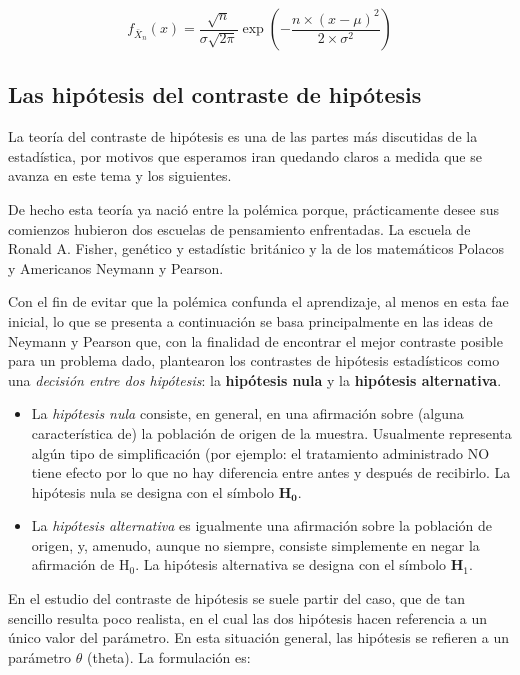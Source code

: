 \documentclass[
]{article}
\begin{document}
\[
f_{\bar{X}_{n}}(x)=\frac{\sqrt{n}}{\sigma \sqrt{2 \pi}} \exp \left(-\frac{n \times(x-\mu)^{2}}{2 \times \sigma^{2}}\right)
\]

\subsection{Las hipótesis del contraste de hipótesis}\label{las-hipuxf3tesis-del-contraste-de-hipuxf3tesis}

La teoría del contraste de hipótesis es una de las partes más discutidas de la estadística, por motivos que esperamos iran quedando claros a medida que se avanza en este tema y los siguientes.

De hecho esta teoría ya nació entre la polémica porque, prácticamente desee sus comienzos hubieron dos escuelas de pensamiento enfrentadas. La escuela de Ronald A. Fisher, genético y estadístic británico y la de los matemáticos Polacos y Americanos Neymann y Pearson.

Con el fin de evitar que la polémica confunda el aprendizaje, al menos en esta fae inicial, lo que se presenta a continuación se basa principalmente en las ideas de Neymann y Pearson que, con la finalidad de encontrar el mejor contraste posible para un problema dado, plantearon los contrastes de hipótesis estadísticos como una \emph{decisión entre dos hipótesis}: la \textbf{hipótesis nula} y la \textbf{hipótesis alternativa}.

\begin{itemize}
\item
  La \emph{hipótesis nula} consiste, en general, en una afirmación sobre (alguna característica de) la población de origen de la muestra. Usualmente representa algún tipo de simplificación (por ejemplo: el tratamiento administrado NO tiene efecto por lo que no hay diferencia entre antes y después de recibirlo. La hipótesis nula se designa con el símbolo \(\mathbf{H}_{\mathbf{0}}\).
\item
  La \emph{hipótesis alternativa} es igualmente una afirmación sobre la población de origen, y, amenudo, aunque no siempre, consiste simplemente en negar la afirmación de \(\mathrm{H}_{0}\). La hipótesis alternativa se designa con el símbolo \(\mathbf{H}_{1}\).
\end{itemize}

En el estudio del contraste de hipótesis se suele partir del caso, que de tan sencillo resulta poco realista, en el cual las dos hipótesis hacen referencia a un único valor del parámetro. En esta situación general, las hipótesis se refieren a un parámetro \(\theta\) (theta). La formulación es:
\end{document}
